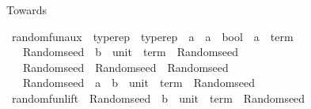 \begin{isabellebody}
%
\isadelimdocument
%
\endisadelimdocument
%
\isatagdocument
%
\isamarkuptrue%
%
\endisatagdocument
{\isafolddocument}%
%
\isadelimdocument
%
\endisadelimdocument
%
\begin{isamarkuptext}%
Towards %
\end{isamarkuptext}\isamarkuptrue%
\isamarkupfalse%
\ random{\isacharunderscore}{\kern0pt}fun{\isacharunderscore}{\kern0pt}aux\ {\isacharcolon}{\kern0pt}{\isacharcolon}{\kern0pt}\ {\isachardoublequoteopen}typerep\ {\isasymRightarrow}\ typerep\ {\isasymRightarrow}\ {\isacharparenleft}{\kern0pt}{\isacharprime}{\kern0pt}a\ {\isasymRightarrow}\ {\isacharprime}{\kern0pt}a\ {\isasymRightarrow}\ bool{\isacharparenright}{\kern0pt}\ {\isasymRightarrow}\ {\isacharparenleft}{\kern0pt}{\isacharprime}{\kern0pt}a\ {\isasymRightarrow}\ term{\isacharparenright}{\kern0pt}\isanewline
\ \ {\isasymRightarrow}\ {\isacharparenleft}{\kern0pt}Random{\isachardot}{\kern0pt}seed\ {\isasymRightarrow}\ {\isacharparenleft}{\kern0pt}{\isacharprime}{\kern0pt}b\ {\isasymtimes}\ {\isacharparenleft}{\kern0pt}unit\ {\isasymRightarrow}\ term{\isacharparenright}{\kern0pt}{\isacharparenright}{\kern0pt}\ {\isasymtimes}\ Random{\isachardot}{\kern0pt}seed{\isacharparenright}{\kern0pt}\isanewline
\ \ {\isasymRightarrow}\ {\isacharparenleft}{\kern0pt}Random{\isachardot}{\kern0pt}seed\ {\isasymRightarrow}\ Random{\isachardot}{\kern0pt}seed\ {\isasymtimes}\ Random{\isachardot}{\kern0pt}seed{\isacharparenright}{\kern0pt}\isanewline
\ \ {\isasymRightarrow}\ Random{\isachardot}{\kern0pt}seed\ {\isasymRightarrow}\ {\isacharparenleft}{\kern0pt}{\isacharparenleft}{\kern0pt}{\isacharprime}{\kern0pt}a\ {\isasymRightarrow}\ {\isacharprime}{\kern0pt}b{\isacharparenright}{\kern0pt}\ {\isasymtimes}\ {\isacharparenleft}{\kern0pt}unit\ {\isasymRightarrow}\ term{\isacharparenright}{\kern0pt}{\isacharparenright}{\kern0pt}\ {\isasymtimes}\ Random{\isachardot}{\kern0pt}seed{\isachardoublequoteclose}\isanewline
\isanewline
{}\isamarkupfalse%
\ random{\isacharunderscore}{\kern0pt}fun{\isacharunderscore}{\kern0pt}lift\ {\isacharcolon}{\kern0pt}{\isacharcolon}{\kern0pt}\ {\isachardoublequoteopen}{\isacharparenleft}{\kern0pt}Random{\isachardot}{\kern0pt}seed\ {\isasymRightarrow}\ {\isacharparenleft}{\kern0pt}{\isacharprime}{\kern0pt}b\ {\isasymtimes}\ {\isacharparenleft}{\kern0pt}unit\ {\isasymRightarrow}\ term{\isacharparenright}{\kern0pt}{\isacharparenright}{\kern0pt}\ {\isasymtimes}\ Random{\isachardot}{\kern0pt}seed{\isacharparenright}{\kern0pt}\isanewline

\end{isabellebody}
